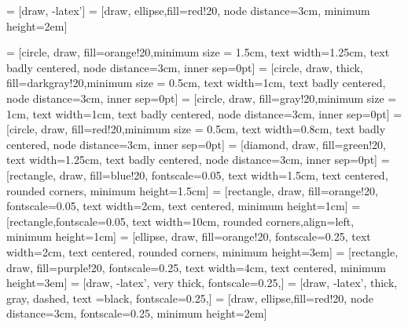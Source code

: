\usetikzlibrary{shapes.arrows,shapes.geometric,arrows,shadows,automata,positioning,arrows,calc}
\setlength{}  
\setlength\leftmargini{\dimexpr\leftmargini + 0.5em\relax}
\usepackage{relsize}
 = [draw, -latex']
 = [draw, ellipse,fill=red!20, node distance=3cm,
    minimum height=2em]
    \usepackage{pgfplots}
\pgfplotsset{compat=1.3}
\tikzset{>=latex}
 = [circle, draw, fill=orange!20,minimum size = 1.5cm, 
    text width=1.25cm, text badly centered, node distance=3cm, inner sep=0pt]
     = [circle, draw, thick, fill=darkgray!20,minimum size = 0.5cm, 
    text width=1cm, text badly centered, node distance=3cm, inner sep=0pt]
 = [circle, draw, fill=gray!20,minimum size = 1cm, 
    text width=1cm, text badly centered, node distance=3cm, inner sep=0pt]
 = [circle, draw, fill=red!20,minimum size = 0.5cm, 
   text width=0.8cm, text badly centered, node distance=3cm, inner sep=0pt]  
 = [diamond, draw, fill=green!20, 
    text width=1.25cm, text badly centered, node distance=3cm, inner sep=0pt]
 = [rectangle, draw, fill=blue!20, fontscale=0.05,
    text width=1.5cm, text centered, rounded corners, minimum height=1.5cm]
 = [rectangle, draw, fill=orange!20, fontscale=0.05,
    text width=2cm, text centered, minimum height=1cm]
     = [rectangle,fontscale=0.05,
    text width=10cm, rounded corners,align=left, minimum height=1cm]
     = [ellipse, draw, fill=orange!20,  fontscale=0.25,
    text width=2cm, text centered, rounded corners, minimum height=3em]
     = [rectangle, draw, fill=purple!20,  fontscale=0.25,
    text width=4cm, text centered, minimum height=3em]
 = [draw, -latex', very thick, fontscale=0.25,]
 = [draw, -latex', thick, gray, dashed, text =black, fontscale=0.25,]
 = [draw, ellipse,fill=red!20, node distance=3cm,  fontscale=0.25,
    minimum height=2em]  







